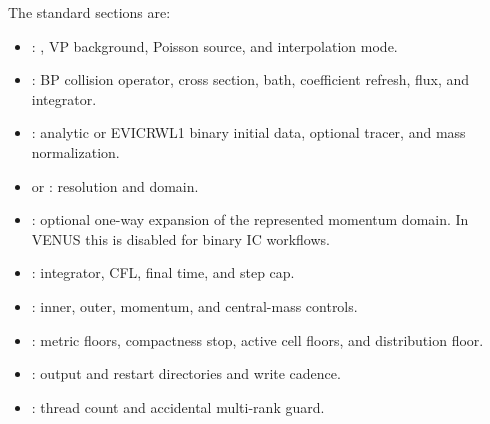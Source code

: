 The standard sections are:
\begin{itemize}
\item \code{[physics]}: , VP background, Poisson source,
and interpolation mode.
\item \code{[collisions]}: BP collision operator, cross section, bath,
coefficient refresh, flux, and integrator.
\item {}: analytic or EVICRWL1 binary initial data, optional
tracer, and mass normalization.
\item {} or
: resolution and domain.
\item \code{[adaptive_w]}: optional one-way expansion of the represented
momentum domain.  In VENUS this is disabled for binary IC workflows.
\item {}: integrator, CFL, final time, and step cap.
\item \code{[boundaries]}: inner, outer, momentum, and central-mass controls.
\item {}: metric floors, compactness stop, active
cell floors, and distribution floor.
\item \code{[output]}: output and restart directories and write cadence.
\item \code{[parallelism]}: thread count and accidental multi-rank guard.
\end{itemize}
